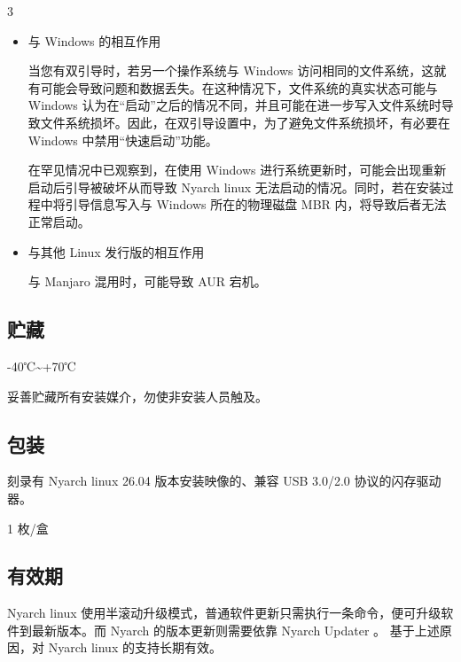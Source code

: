 \documentclass{article}
\begin{document}
\begin{multicols*}{3}
\begin{itemize}[leftmargin=*]
		\item 与 Windows 的相互作用

		当您有双引导时，若另一个操作系统与 Windows 访问相同的文件系统，这就有可能会导致问题和数据丢失。在这种情况下，文件系统的真实状态可能与 Windows 认为在“启动”之后的情况不同，并且可能在进一步写入文件系统时导致文件系统损坏。因此，在双引导设置中，为了避免文件系统损坏，有必要在 Windows 中禁用“快速启动”功能。

		在罕见情况中已观察到，在使用 Windows 进行系统更新时，可能会出现重新启动后引导被破坏从而导致 Nyarch linux 无法启动的情况。同时，若在安装过程中将引导信息写入与 Windows 所在的物理磁盘 MBR 内，将导致后者无法正常启动。

		\item 与其他 Linux 发行版的相互作用

		与 Manjaro 混用时，可能导致 AUR 宕机。

	\end{itemize}


	\begin{tcolorbox}
	\section*{贮藏}
	\end{tcolorbox}

	-40℃\textasciitilde +70℃

	妥善贮藏所有安装媒介，勿使非安装人员触及。

	\medskip


	\begin{tcolorbox}
	\section*{包装}
	\end{tcolorbox}

	刻录有 Nyarch linux 26.04 版本安装映像的、兼容 USB 3.0/2.0 协议的闪存驱动器。

	1 枚/盒

	\medskip


	\begin{tcolorbox}
	\section*{有效期}
	\end{tcolorbox}

	Nyarch linux 使用半滚动升级模式，普通软件更新只需执行一条命令，便可升级软件到最新版本。而 Nyarch 的版本更新则需要依靠 Nyarch Updater 。 基于上述原因，对 Nyarch linux 的支持长期有效。


\end{multicols*}
\end{document}
